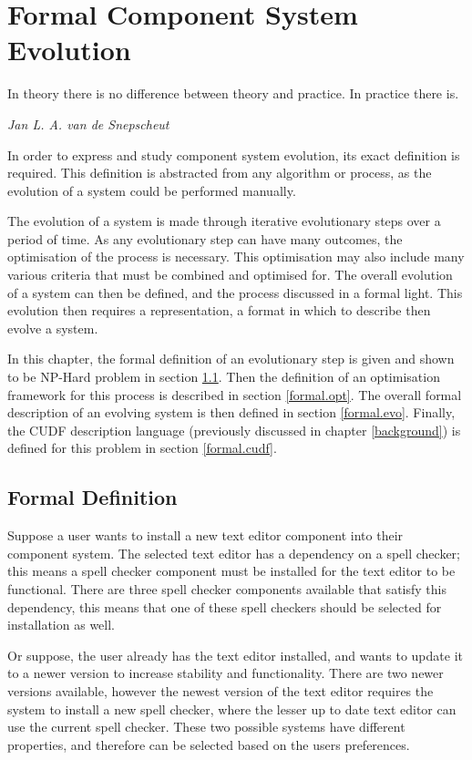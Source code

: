 \chapter{Formal Component System Evolution}
\label{formal}
\epigraph{In theory there is no difference between theory and practice. In practice there is.}
{\textit{Jan L. A. van de Snepscheut}}
In order to express and study component system evolution, its exact definition is required.
This definition is abstracted from any algorithm or process, as the evolution of a system could be performed manually.

The evolution of a system is made through iterative evolutionary steps over a period of time.
As any evolutionary step can have many outcomes, the optimisation of the process is necessary.
This optimisation may also include many various criteria that must be combined and optimised for.
The overall evolution of a system can then be defined, and the process discussed in a formal light.
This evolution then requires a representation, a format in which to describe then evolve a system.

In this chapter, the formal definition of an evolutionary step is given and shown to be NP-Hard problem in section \ref{formal.step}.
Then the definition of an optimisation framework for this process is described in section \ref{formal.opt}.
The overall formal description of an evolving system is then defined in section \ref{formal.evo}.
Finally, the CUDF description language (previously discussed in chapter \ref{background}) is defined for this problem in section \ref{formal.cudf}.

\section{Formal Definition}
\label{formal.step}
Suppose a user wants to install a new text editor component into their component system.
The selected text editor has a dependency on a spell checker;
this means a spell checker component must be installed for the text editor to be functional.
There are three spell checker components available that satisfy this dependency,
this means that one of these spell checkers should be selected for installation as well.

Or suppose, the user already has the text editor installed, and wants to update it to a newer version to increase stability and functionality.
There are two newer versions available, however the newest version of the text editor requires the system to install a new spell checker,
where the lesser up to date text editor can use the current spell checker.
These two possible systems have different properties, and therefore can be selected based on the users preferences.

